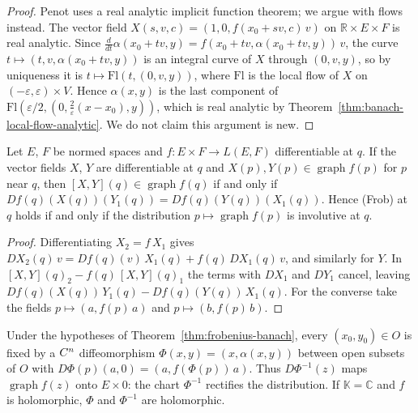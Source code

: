 \begin{proof}
  \leanok
  Penot uses a real analytic implicit function theorem; we argue with flows instead. The vector
  field $X(s, v, c) = (1, 0, f(x_0 + sv, c)\,v)$ on $\mathbb{R} \times E \times F$ is real
  analytic. Since $\frac{d}{dt}\alpha(x_0 + tv, y) = f(x_0 + tv, \alpha(x_0 + tv, y))\,v$, the
  curve $t \mapsto (t, v, \alpha(x_0 + tv, y))$ is an integral curve of $X$ through $(0, v, y)$,
  so by uniqueness it is $t \mapsto \mathrm{Fl}(t, (0, v, y))$, where $\mathrm{Fl}$ is the local
  flow of $X$ on $(-\varepsilon, \varepsilon) \times V$. Hence $\alpha(x, y)$ is the last
  component of $\mathrm{Fl}(\varepsilon/2, (0, \tfrac{2}{\varepsilon}(x - x_0), y))$, which is
  real analytic by Theorem~\ref{thm:banach-local-flow-analytic}. We do not claim this argument is
  new.
\end{proof}

\begin{proposition}
  \label{prop:frobenius-involutive}
  \leanok
  Let $E$, $F$ be normed spaces and $f \colon E \times F \to L(E, F)$ differentiable at $q$. If
  the vector fields $X$, $Y$ are differentiable at $q$ and $X(p), Y(p) \in \operatorname{graph}
  f(p)$ for $p$ near $q$, then $[X, Y](q) \in \operatorname{graph} f(q)$ if and only if
  $Df(q)(X(q))(Y_1(q)) = Df(q)(Y(q))(X_1(q))$. Hence (Frob) at $q$ holds if and only if the
  distribution $p \mapsto \operatorname{graph} f(p)$ is involutive at $q$.
\end{proposition}

\begin{proof}
  \leanok
  Differentiating $X_2 = f\,X_1$ gives $DX_2(q)\,v = Df(q)(v)\,X_1(q) + f(q)\,DX_1(q)\,v$, and
  similarly for $Y$. In $[X, Y](q)_2 - f(q)\,[X, Y](q)_1$ the terms with $DX_1$ and $DY_1$ cancel,
  leaving $Df(q)(X(q))\,Y_1(q) - Df(q)(Y(q))\,X_1(q)$. For the converse take the fields
  $p \mapsto (a, f(p)\,a)$ and $p \mapsto (b, f(p)\,b)$.
\end{proof}

\begin{theorem}
  \label{thm:frobenius-chart}
  \leanok
  Under the hypotheses of Theorem~\ref{thm:frobenius-banach}, every $(x_0, y_0) \in O$ is fixed
  by a $C^{n}$ diffeomorphism $\Phi(x, y) = (x, \alpha(x, y))$ between open subsets of $O$ with
  $D\Phi(p)(a, 0) = (a, f(\Phi(p))\,a)$. Thus $D\Phi^{-1}(z)$ maps $\operatorname{graph} f(z)$
  onto $E \times 0$: the chart $\Phi^{-1}$ rectifies the distribution. If $\mathbb{K} = \mathbb{C}$
  and $f$ is holomorphic, $\Phi$ and $\Phi^{-1}$ are holomorphic.
\end{theorem}

